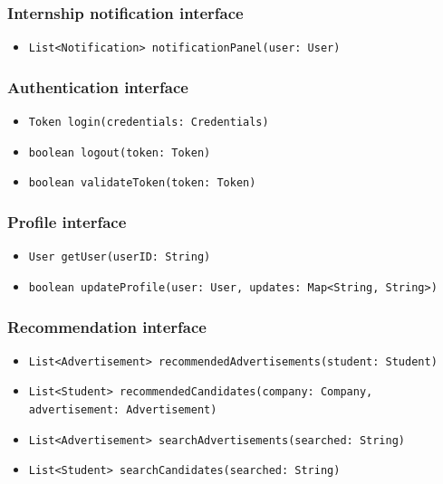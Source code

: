 \subsubsection{Internship notification interface}
\begin{itemize}
    \item \verb|List<Notification> notificationPanel(user: User)|
\end{itemize}

\subsubsection{Authentication interface}
\begin{itemize}
    \item \verb|Token login(credentials: Credentials)|
    \item \verb|boolean logout(token: Token)|
    \item \verb|boolean validateToken(token: Token)|
\end{itemize}

\subsubsection{Profile interface}
\begin{itemize}
    \item \verb|User getUser(userID: String)|
    \item \verb|boolean updateProfile(user: User, updates: Map<String, String>)|
\end{itemize}

\subsubsection{Recommendation interface}
\begin{itemize}
    \item \verb|List<Advertisement> recommendedAdvertisements(student: Student)|
    \item \verb|List<Student> recommendedCandidates(company: Company, | \\ \makebox[10em][l]{} \verb|advertisement: Advertisement)|
    \item \verb|List<Advertisement> searchAdvertisements(searched: String)|
    \item \verb|List<Student> searchCandidates(searched: String)|
\end{itemize}


